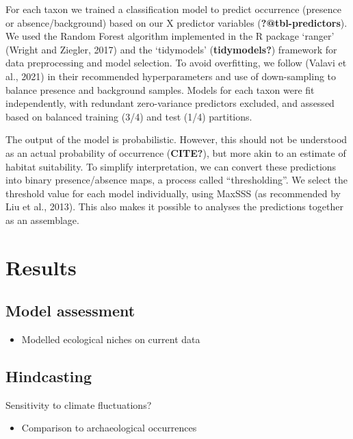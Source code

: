 \documentclass[
  number,
  review]{elsarticle}
\providecommand{\tightlist}{%
  \setlength{\itemsep}{0pt}\setlength{\parskip}{0pt}}\usepackage{longtable,booktabs,array}
\begin{document}
For each taxon we trained a classification model to predict occurrence
(presence or absence/background) based on our X predictor variables
(\textbf{?@tbl-predictors}). We used the Random Forest algorithm
implemented in the R package `ranger' (Wright and Ziegler, 2017) and the
`tidymodels' (\textbf{tidymodels?}) framework for data preprocessing and
model selection. To avoid overfitting, we follow (Valavi et al., 2021)
in their recommended hyperparameters and use of down-sampling to balance
presence and background samples. Models for each taxon were fit
independently, with redundant zero-variance predictors excluded, and
assessed based on balanced training (3/4) and test (1/4) partitions.

The output of the model is probabilistic. However, this should not be
understood as an actual probability of occurrence (\textbf{CITE?}), but
more akin to an estimate of habitat suitability. To simplify
interpretation, we can convert these predictions into binary
presence/absence maps, a process called ``thresholding''. We select the
threshold value for each model individually, using MaxSSS (as
recommended by Liu et al., 2013). This also makes it possible to
analyses the predictions together as an assemblage.

\section{Results}\label{results}

\subsection{Model assessment}\label{model-assessment}

\begin{itemize}
\tightlist
\item
  Modelled ecological niches on current data
\end{itemize}

\subsection{Hindcasting}\label{hindcasting}

Sensitivity to climate fluctuations?

\begin{itemize}
\tightlist
\item
  Comparison to archaeological occurrences
\end{itemize}
\end{document}
